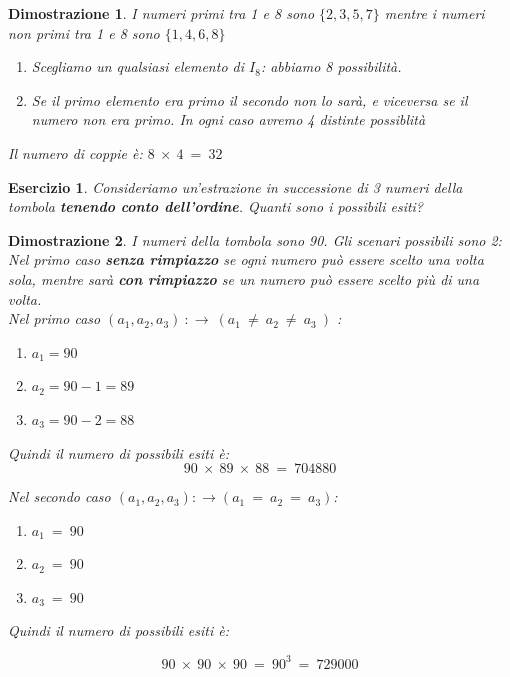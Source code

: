 \documentclass[12pt, a4paper]{article}
\theoremstyle{break}
\theoremstyle{lemma}
\newtheorem{eser}{Esercizio}
\theoremstyle{lemma}
\newtheorem{dimo}{Dimostrazione}
\theoremstyle{lemma}
\begin{document}
\begin{dimo}
  I numeri primi tra 1 e 8 sono $\{ 2, 3, 5, 7\}$ mentre i numeri non primi tra 1 e 8 sono $\{ 1, 4, 6, 8\}$

\begin{enumerate}[label=\Roman*.]
  \item Scegliamo un qualsiasi elemento di $I_8$: abbiamo 8 possibilità.
  \item Se il primo elemento era primo il secondo non lo sarà, e viceversa se il numero non era primo. In ogni caso avremo 4 distinte possiblità

\end{enumerate}
Il numero di coppie è: $8\ \times\ 4\ =\ 32$
\end{dimo}

\begin{eser}
  Consideriamo un'estrazione in successione di 3 numeri della tombola \textbf{tenendo conto dell'ordine}. Quanti sono i possibili esiti?
\end{eser}

\begin{dimo}
  I numeri della tombola sono 90. Gli scenari possibili sono 2:\\
  Nel primo caso \textbf{senza rimpiazzo} se ogni numero può essere scelto una volta sola, mentre sarà \textbf{con rimpiazzo} se un numero può essere scelto più di una volta.\\

Nel primo caso $(a_1, a_2, a_3)\ :\rightarrow\ (a_1\ \neq\ a_2\ \neq\ a_3\ )$ :

\begin{enumerate}[label=\Roman* \textsc{fase}:]
    \item  $a_1 = 90$
    \item  $a_2 = 90 - 1 = 89$
    \item  $a_3 = 90 - 2 = 88$
\end{enumerate}

Quindi il numero di possibili esiti è:
\begin{equation}
  90\ \times\ 89\ \times\ 88\ =\ 704880
\end{equation}

Nel secondo caso $(a_1,a_2,a_3) :\rightarrow (a_1\ =\ a_2\ =\ a_3)$:
\begin{enumerate}[label=\Roman* \textsc{fase}:]
    \item  $a_1\ =\ 90$
    \item  $a_2\ =\ 90$
    \item  $a_3\ =\ 90$
\end{enumerate}
Quindi il numero di possibili esiti è:

\begin{equation}
  90\ \times\ 90\ \times\ 90\ =\ 90^3\ =\ 729000
\end{equation}
\end{dimo}
\end{document}
